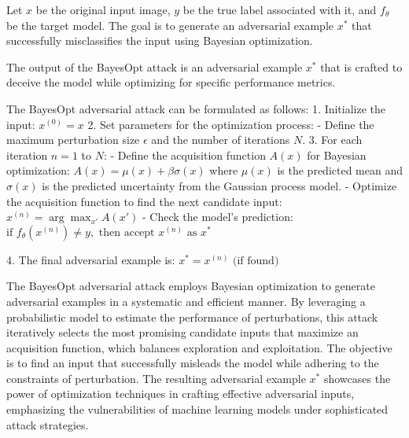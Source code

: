 Let $x$ be the original input image, $y$ be the true label associated with it, and $f_{\theta}$ be the target model. The goal is to generate an adversarial example $x^*$ that successfully misclassifies the input using Bayesian optimization.

The output of the BayesOpt attack is an adversarial example $x^*$ that is crafted to deceive the model while optimizing for specific performance metrics.

The BayesOpt adversarial attack can be formulated as follows:
1. Initialize the input:
   $x^{(0)} = x$
2. Set parameters for the optimization process:
   - Define the maximum perturbation size $\epsilon$ and the number of iterations $N$.
3. For each iteration $n = 1$ to $N$:
   - Define the acquisition function $A(x)$ for Bayesian optimization:
   $A(x) = \mu(x) + \beta \sigma(x)$
   where $\mu(x)$ is the predicted mean and $\sigma(x)$ is the predicted uncertainty from the Gaussian process model.
   - Optimize the acquisition function to find the next candidate input:
   $x^{(n)} = \arg\max_{x'} A(x')$
   - Check the model's prediction:
   $\text{if } f_{\theta}(x^{(n)}) \neq y, \text{ then accept } x^{(n)} \text{ as } x^*$

4. The final adversarial example is:
   $x^* = x^{(n)} \text{ (if found)}$

The BayesOpt adversarial attack employs Bayesian optimization to generate adversarial examples in a systematic and efficient manner. By leveraging a probabilistic model to estimate the performance of perturbations, this attack iteratively selects the most promising candidate inputs that maximize an acquisition function, which balances exploration and exploitation. The objective is to find an input that successfully misleads the model while adhering to the constraints of perturbation. The resulting adversarial example $x^*$ showcases the power of optimization techniques in crafting effective adversarial inputs, emphasizing the vulnerabilities of machine learning models under sophisticated attack strategies.
